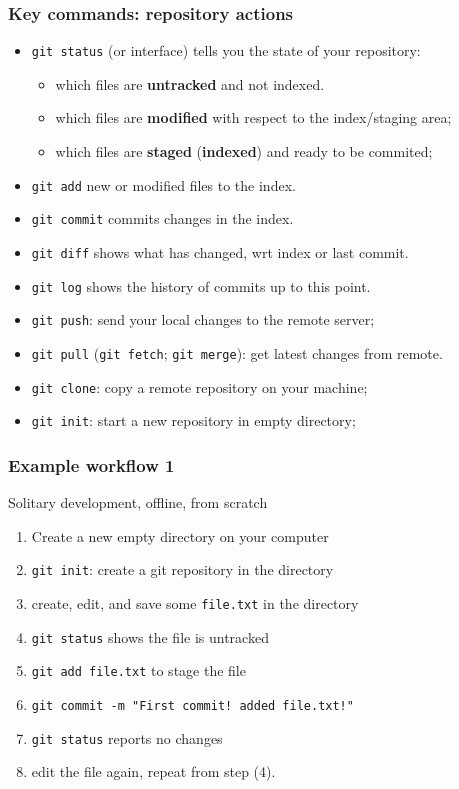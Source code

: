 \documentclass[10pt,svgnames,handout]{beamer}
\begin{document}
\begin{frame}
\frametitle{Key commands: repository actions}

\begin{itemize}[<+->]
\item \lstinline{git status} (or interface) tells you the state of your repository:
\begin{itemize}
  \item which files are \textbf{untracked} and not indexed.
  \item which files are \textbf{modified} with respect to the index/staging area;
  \item which files are \textbf{staged} (\textbf{indexed}) and ready to be commited;
\end{itemize}
\item \lstinline|git add| new or modified files to the index.
\item \lstinline|git commit| commits changes in the index.
\bigskip
\item \lstinline{git diff} shows what has changed, wrt index or last commit.
\item \lstinline{git log} shows the history of commits up to this point.
\bigskip
\item \lstinline|git push|: send your local changes to the remote server;
\item \lstinline|git pull| (\lstinline{git fetch}; \lstinline{git merge}): get latest changes from remote.
\bigskip
\item \lstinline|git clone|: copy a remote repository on your machine;
\item \lstinline|git init|: start a new repository in empty directory;
\end{itemize}
\end{frame}


\begin{frame}
\frametitle{Example workflow 1}

\begin{block}{Solitary development, offline, from scratch}
    
\begin{enumerate}
  \item Create a new empty directory on your computer
  \item \lstinline|git init|: create a git repository in the directory
  \item create, edit, and save some \texttt{file.txt} in the directory
  \item \lstinline|git status| shows the file is untracked
  \item \lstinline|git add file.txt| to stage the file
  \item \lstinline|git commit -m "First commit! added file.txt!"|
  \item \lstinline|git status| reports no changes
  \item edit the file again, repeat from step (4).
\end{enumerate}
\end{block}
\end{frame}
\end{document}
